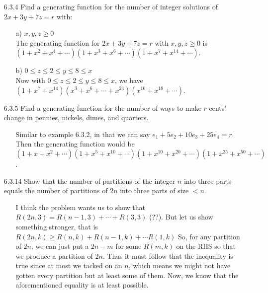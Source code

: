 \documentclass[12pt]{article}
\begin{document}
\begin{enumerate}
\item[6.3.4] Find a generating function for the number of integer solutions of $2x + 3y + 7z = r$ with:
\begin{enumerate}
\item[a)] $x, y, z \geq 0$ \\
The generating function for $2x + 3y + 7z = r$ with $x, y, z \geq 0$ is \\
$(1 + x^2 + x^4 + \cdots )(1 + x^3 + x^6 + \cdots )(1 + x^7 + x^{14} + \cdots )$.
\item[b)] $0 \leq z \leq 2 \leq y \leq 8 \leq x$ \\
Now with $0 \leq z \leq 2 \leq y \leq 8 \leq x$, we have \\
$(1 + x^7 + x^{14})(x^3 + x^6 + \cdots + x^{24})(x^{16} + x^{18} + \cdots )$.
\end{enumerate}

\item[6.3.5] Find a generating function for the number of ways to make $r$ cents' change in pennies, nickels, dimes, and quarters.
\begin{enumerate}
\item[] Similar to example 6.3.2, in that we can say $e_1 + 5e_2 + 10e_3 + 25e_4 = r$. Then the generating
function would be \\ $(1 + x + x^2 + \cdots )(1 + x^5 + x^{10} + \cdots )
(1 + x^{10} + x^{20} + \cdots )(1 + x^{25} + x^{50} + \cdots )$.
\end{enumerate}

\item[6.3.14] Show that the number of partitions of the integer $n$ into three parts equals the number of partitions of $2n$ into three parts of size $< n$.
\begin{enumerate}
\item[] I think the problem wants us to show that $R(2n, 3) = R(n - 1, 3) + \cdots + R(3, 3)$ (??). But
let us show something stronger, that is $R(2n, k) \geq R(n, k) + R(n - 1, k) + \cdots R(1, k)$
So, for any partition of $2n$, we can just put a $2n - m$ for some $R(m, k)$ on the RHS so that we produce a partition
of $2n$. Thus it must follow that the inequality is true since at most we tacked on an $n$, which means we might
not have gotten every partition but at least some of them. Now, we know that the aforementioned equality is
at least possible.
\end{enumerate}


\end{enumerate}
\end{document}
